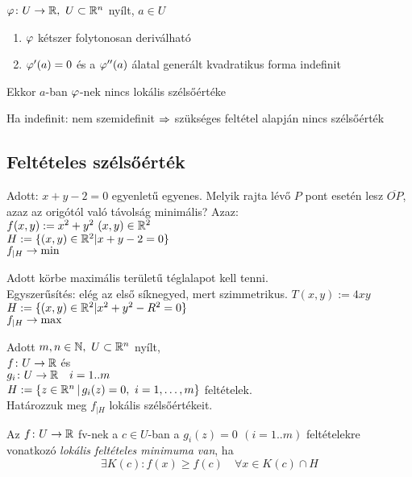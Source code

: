 \begin{te}
  $\varphi\colon U\to\mathbb{R},\ U\subset \mathbb{R}^n$ nyílt, $a\in U$
{\listazjromai
\begin{enumerate}
\item $\varphi$ kétszer folytonosan deriválható
\item $\varphi'(a)=0$ és a $\varphi''(a)$ álatal generált kvadratikus forma indefinit
\end{enumerate}
}
Ekkor $a$-ban $\varphi$-nek nincs lokális szélsőértéke
\end{te}
\begin{biz}
  Ha indefinit: nem szemidefinit $\Rightarrow$ szükséges feltétel alapján nincs szélsőérték
\end{biz}

\subsection{Feltételes szélsőérték}
\begin{PlSS}
  Adott: $x+y-2=0$ egyenletű egyenes. Melyik rajta lévő $P$ pont esetén lesz $\overline{OP}$, azaz az origótól való
  távolság minimális? Azaz:\\
  $f(x,y) := x^2 + y^2\ (x,y)\in\R^2$\\
  $H:=\{(x,y)\in\mathbb{R}^2| x+y-2=0\}$\\
  $f_{|H}\to\min$
\end{PlSS}
\begin{PlSS}\label{plss:fsz2}
  Adott körbe maximális területű téglalapot kell tenni.\\
  Egyszerűsítés: elég az első síknegyed, mert szimmetrikus.
  $T(x,y) := 4xy$\\
  $H:=\{(x,y)\in\mathbb{R}^2| x^2 + y^2 - R^2 =0\}$\\
  $f_{|H}\to\max$
\end{PlSS}
Adott $m,n\in\mathbb{N},\ U\subset\mathbb{R}^n$ nyílt,\\
$f\colon U\to\mathbb{R}$ és\\
$g_i\colon U\to\mathbb{R}\quad i=1..m$\\
$H:=\{ z\in\R^n\,|\,g_i(z)=0,\ i=1,\dotsc,m\}$ feltételek.\\
Határozzuk meg $f_{|H}$ lokális szélsőértékeit.

\begin{de}
  Az $f\colon U\to\mathbb{R}$ fv-nek  a $c\in U$-ban a $g_i(z)=0\ \,(i=1..m)$ feltételekre vonatkozó \emph{lokális feltételes
    minimuma van}, ha
  \[\exists K(c): f(x) \geq f(c)\quad \forall x\in K(c)\cap H\]
\end{de}

